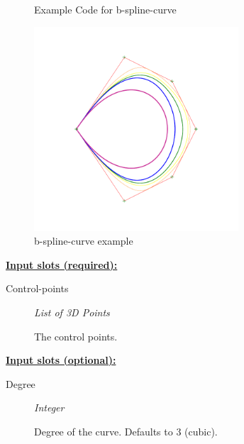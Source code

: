 \documentclass [11pt]{book}
\begin{document}
\begin{itemize}
\begin{figure}
\caption{Example Code for b-spline-curve}

\label{fig:example-code-b-spline-curve}

\end{figure}

\begin{figure}
\begin{center}
\includegraphics[width=3in,height=3in]{../images/example-b-spline-curve.pdf}
\end{center}

\caption{b-spline-curve example}

\label{fig:b-spline-curve}

\end{figure}





\textbf{
\underline{Input slots (required):}}

\begin{description}

\item [Control-points]
\emph{List of 3D Points}

 The control points.




\end{description}






\textbf{
\underline{Input slots (optional):}}

\begin{description}

\item [Degree]
\emph{Integer}

 Degree of the curve. Defaults to 3 (cubic).





\end{description}
\end{itemize}
\end{document}
